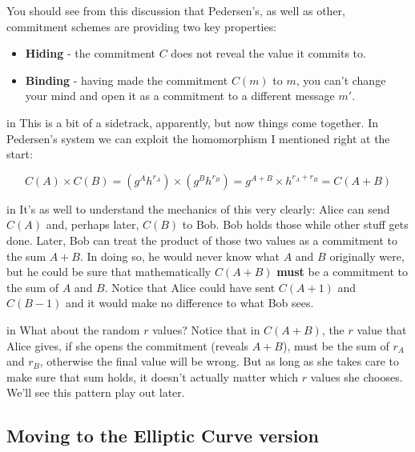 \documentclass[10pt,a4paper]{article}
\begin{document}
You should see from this discussion that Pedersen's, as well as other, commitment schemes are providing two key properties:
\begin{itemize}
\item \textbf{Hiding} - the commitment $C$ does not reveal the value it commits to.
\item \textbf{Binding} - having made the commitment $C(m)$ to $m$, you can't change your mind and open it as a commitment to a different message $m'$.
\end{itemize}

 in \noindent This is a bit of a sidetrack, apparently, but now things come together. In Pedersen's system we can exploit the homomorphism I mentioned right at the start:

\[C(A) \times C(B) = (g^A h^{r_A}) \times (g^B h^{r_B}) = g^{A+B} \times h^{r_A + r_B} = C(A+B) \]

 in \noindent It's as well to understand the mechanics of this very clearly: Alice can send $C(A)$ and, perhaps later, $C(B)$ to Bob. Bob holds those while other stuff gets done. Later, Bob can treat the product of those two values as a commitment to the sum $A+B$. In doing so, he would never know what $A$ and $B$ originally were, but he could be sure that mathematically $C(A+B)$ \textbf{must} be a commitment to the sum of $A$ and $B$. Notice that Alice could have sent $C(A+1)$ and $C(B-1)$ and it would make no difference to what Bob sees.

 in \noindent What about the random $r$ values? Notice that in $C(A+B)$, the $r$ value that Alice gives, if she opens the commitment (reveals $A+B$), must be the sum of $r_A$ and $r_B$, otherwise the final value will be wrong. But as long as she takes care to make sure that sum holds, it doesn't actually matter which $r$ values she chooses. We'll see this pattern play out later.

\subsection{Moving to the Elliptic Curve version}
\end{document}
